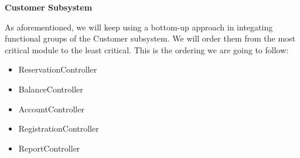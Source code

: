 \begin{large}
\textbf{Customer Subsystem}
\end{large}

As aforementioned, we will keep using a bottom-up approach in integating functional groups of the Customer subsystem. We will order them from the most critical module to the least critical. This is the ordering we are going to follow:
\begin{itemize}
\item ReservationController
\item BalanceController
\item AccountController
\item RegistrationController
\item ReportController
\end{itemize}










